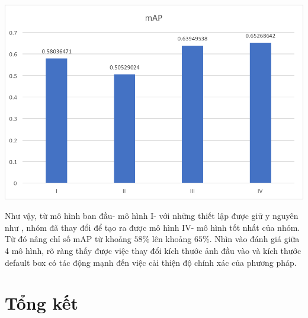 \documentclass[a4paper,12pt]{article}
\begin{document}
	\begin{center}
		\centering
		\includegraphics[width=0.775\linewidth]{mAP.png}
		\vspace{0.5cm}
	\end{center}
	Như vậy, từ mô hình ban đầu- mô hình I- với những thiết lập được giữ y nguyên như \cite{liu2016ssd}, nhóm đã thay đổi để tạo ra được mô hình IV- mô hình tốt nhất của nhóm. Từ đó nâng chỉ số mAP từ khoảng $58\%$ lên khoảng $65\%$. Nhìn vào đánh giá giữa 4 mô hình, rõ ràng thấy được việc thay đổi kích thước ảnh đầu vào và kích thước default box có tác động mạnh đến việc cải thiện độ chính xác của phương pháp. 
	\newpage	
	\section{Tổng kết}
	
\end{document}
